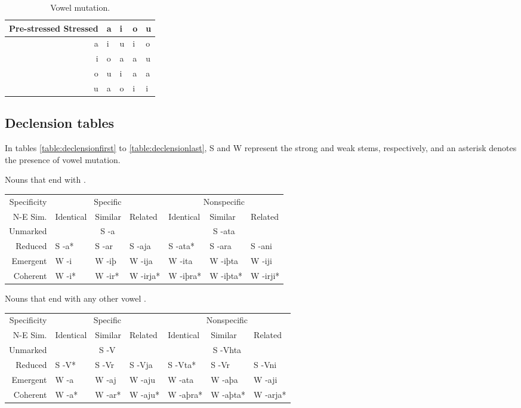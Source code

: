 \documentclass{book}
\begin{document}
\begin{table}
  \caption{Vowel mutation. \label{table:vowelmutation}}
  \centering
  \begin{tabular}{r|llll}
    Pre-stressed \bs{} Stressed & a & i & o & u \\
    \hline
    a & i & u & i & o \\
    i & o & a & a & u \\
    o & u & i & a & a \\
    u & a & o & i & i \\
  \end{tabular}
\end{table}

\subsection{Declension tables}

In tables \ref{table:declensionfirst} to \ref{table:declensionlast}, S and W represent the strong and weak stems, respectively, and an asterisk denotes the presence of vowel mutation.

\begin{tablenf}
  \caption{Nouns that end with . \label{table:declensionfirst}}
  \centering
  \begin{tabular}{r|lll|lll}
    Specificity & \multicolumn{3}{c|}{Specific} & \multicolumn{3}{c}{Nonspecific} \\
    N-E \bs{} Sim. & Identical & Similar & Related & Identical & Similar & Related \\
    \hline
    Unmarked & \multicolumn{3}{c|}{S -a} & \multicolumn{3}{c}{S -ata} \\
    Reduced & S -a* & S -ar & S -aja & S -ata* & S -ara & S -ani \\
    Emergent & W -i & W -iþ & W -ija & W -ita & W -iþta & W -iji \\
    Coherent & W -i* & W -ir* & W -irja* & W -iþra* & W -iþta* & W -irji* \\
  \end{tabular}
\end{tablenf}

\begin{tablenf}
  \caption{Nouns that end with any other vowel .}
  \centering
  \begin{tabular}{r|lll|lll}
    Specificity & \multicolumn{3}{c|}{Specific} & \multicolumn{3}{c}{Nonspecific} \\
    N-E \bs{} Sim. & Identical & Similar & Related & Identical & Similar & Related \\
    \hline
    Unmarked & \multicolumn{3}{c|}{S -V} & \multicolumn{3}{c}{S -Vhta} \\
    Reduced & S -V* & S -Vr & S -Vja & S -Vta* & S -Vr & S -Vni \\
    Emergent & W -a & W -aj & W -aju & W -ata & W -aþa & W -aji \\
    Coherent & W -a* & W -ar* & W -aju* & W -aþra* & W -aþta* & W -arja* \\
  \end{tabular}
\end{tablenf}
\end{document}
